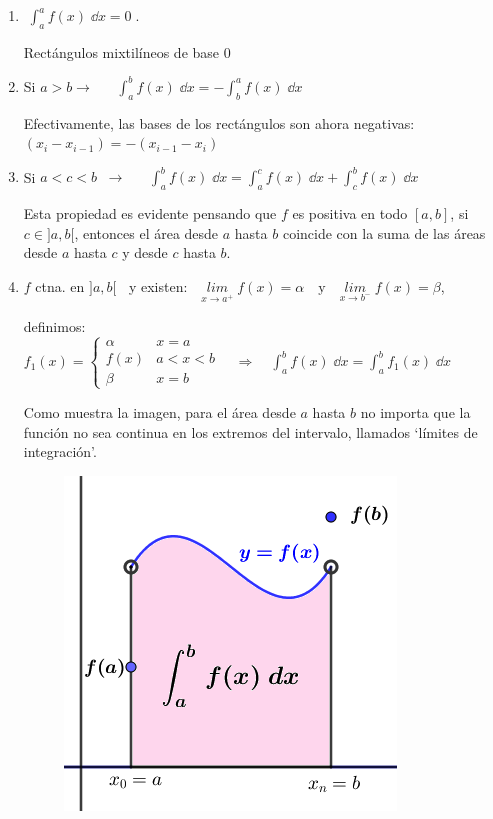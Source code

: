 \begin{enumerate}
	\item $\boxed{\; \displaystyle \int_a^a f(x)\; \dd x = 0 \; }$. 

	Rectángulos mixtilíneos de base $0$
	
	\item Si $a>b \to \quad $   $\boxed{ \; \displaystyle \int_a^b f(x)\; \dd x =-\displaystyle \int_b^a f(x)\; \dd x \; }$ 
	
	Efectivamente, las bases de los rectángulos son ahora negativas: $(x_i-x_{i-1})=-(x_{i-1}-x_i)$
	
	\item Si $a<c<b \; \; \to \quad$ $\boxed{ \; \displaystyle \int_a^b f(x)\; \dd x = \int_a^c f(x)\; \dd x +\int_c^b f(x)\; \dd x \; }$ 
	
	Esta propiedad es evidente pensando que $f$ es positiva en todo  $[a,b]$, si $c\in ]a,b[$, entonces el área desde $a$ hasta $b$ coincide con la suma de las áreas desde $a$ hasta $c$ y desde $c$ hasta $b$.
	
	\item $f$ ctna. en $]a,b[\; \;$ y existen:$\quad \underset{x\to a^+}{lim}\;{f(x)}=\alpha \quad \text {y} \quad \underset{x\to b^-}{lim}\;{f(x)}=\beta $,
	
	definimos: $f_1(x)=\begin{cases}
				\alpha & x=a \\
				f(x) & a<x<b \\
				\beta & x=b
				\end{cases} \quad \Rightarrow \displaystyle \quad \int_a^b f(x)\; \dd x=\displaystyle \int_a^b f_1(x)\; \dd x$
	
	\begin{multicols}{2}
	
	Como muestra la imagen, para el área desde $a$ hasta $b$ no importa que la función no sea continua en los extremos del intervalo, llamados `límites de integración'. 
	
	\begin{figure}[H]
	\centering
	\includegraphics[width=.25\textwidth]{imagenes/imagenes08/T08IM06.png}
	\end{figure}
	\end{multicols}
	

\end{enumerate}
